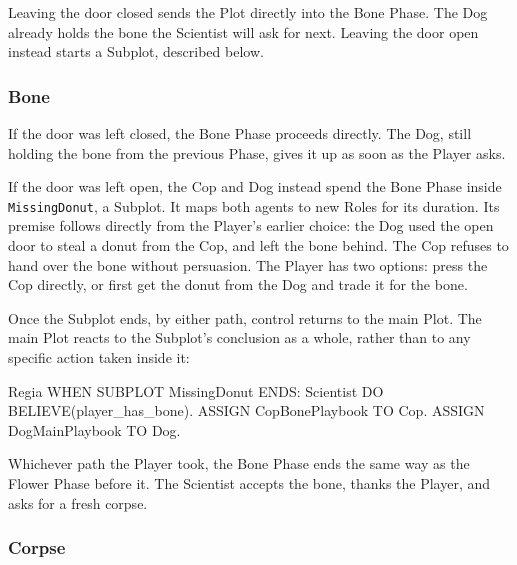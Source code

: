 Leaving the door closed sends the Plot directly into the Bone Phase. The Dog already holds the bone the Scientist will ask for next. Leaving the door open instead starts a Subplot, described below.

\subsubsection{Bone}
\label{sec:test-plot-bone}

If the door was left closed, the Bone Phase proceeds directly. The Dog, still holding the bone from the previous Phase, gives it up as soon as the Player asks.

If the door was left open, the Cop and Dog instead spend the Bone Phase inside \lstinline|MissingDonut|, a Subplot. It maps both agents to new Roles for its duration. Its premise follows directly from the Player's earlier choice: the Dog used the open door to steal a donut from the Cop, and left the bone behind. The Cop refuses to hand over the bone without persuasion. The Player has two options: press the Cop directly, or first get the donut from the Dog and trade it for the bone.


Once the Subplot ends, by either path, control returns to the main Plot. The main Plot reacts to the Subplot's conclusion as a whole, rather than to any specific action taken inside it:

\begin{codeblock}[]{Regia}
WHEN SUBPLOT MissingDonut ENDS:
    Scientist DO BELIEVE(player_has_bone).
    ASSIGN CopBonePlaybook TO Cop.
    ASSIGN DogMainPlaybook TO Dog.
\end{codeblock}

Whichever path the Player took, the Bone Phase ends the same way as the Flower Phase before it. The Scientist accepts the bone, thanks the Player, and asks for a fresh corpse.

\subsubsection{Corpse}
\label{sec:test-plot-corpse}

